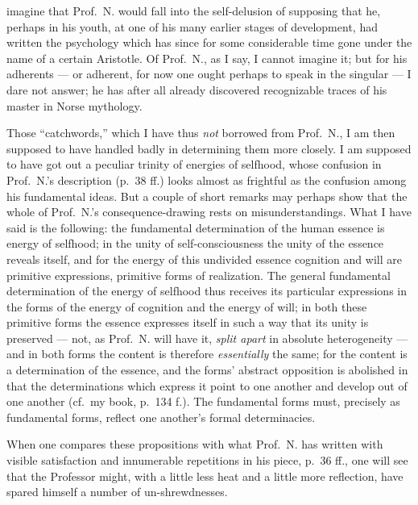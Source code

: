\documentclass[12pt,a4paper]{book}
\begin{document}
imagine that Prof.\ N. would fall into the self-delusion of supposing that he,
perhaps in his youth, at one of his many earlier stages of development, had
written the psychology which has since for some considerable time gone under
the name of a certain Aristotle. Of Prof.\ N., as I say, I cannot imagine it;
but for his
adherents --- or adherent, for now one ought perhaps to speak in the singular
--- I dare not answer; he has after all already discovered recognizable traces
of his master in Norse mythology.

Those ``catchwords,'' which I have thus \emph{not} borrowed from Prof.\ N., I am
then supposed to have handled badly in determining them more closely. I am
supposed to have got out a peculiar trinity of energies of selfhood, whose
confusion in Prof.\ N.'s description (p.\ 38 ff.) looks almost as frightful as
the confusion among his fundamental ideas. But a couple of short remarks may
perhaps show that the whole of Prof.\ N.'s consequence-drawing rests on
misunderstandings. What I have said is the following: the fundamental
determination of the human essence is energy of selfhood; in the unity of
self-consciousness the unity of the essence reveals itself, and for the energy
of this undivided essence cognition and will are primitive expressions,
primitive forms of realization. The general fundamental determination of the
energy of selfhood thus receives its particular expressions in the forms of the
energy of cognition and the energy of will; in both these primitive forms the
essence expresses itself in such a way that its unity is preserved --- not, as
Prof.\ N. will have it, \emph{split apart} in absolute heterogeneity --- and in
both forms the content is therefore \emph{essentially} the same; for the content
is a determination of the essence, and the forms' abstract opposition is
abolished in that the determinations which express it point to one another and
develop out of one another (cf.\ my
\setcounter{footnote}{0}
book, p.\ 134 f.). The fundamental forms must, precisely as fundamental forms,
reflect one another's formal determinacies.

When one compares these propositions with what Prof.\ N. has written with
visible satisfaction and innumerable repetitions in his piece, p.\ 36 ff., one
will see that the Professor might, with a little less heat and a little more
reflection, have spared himself a number of un-shrewdnesses.
\end{document}
